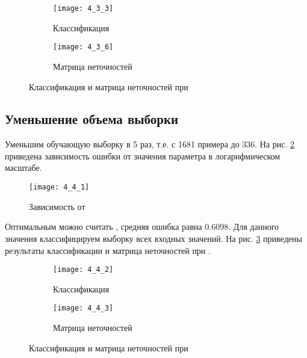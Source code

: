 \begin{figure}[H]
\begin{center}
	\begin{subfigure}{0.49\textwidth}
		\texttt{[image: 4\_3\_3]}
		\caption{Классификация}
	\end{subfigure}
	\begin{subfigure}{0.49\textwidth}
		\texttt{[image: 4\_3\_6]}
		\caption{Матрица неточностей}
	\end{subfigure}
	\caption{Классификация и матрица неточностей при }
	\label{fig:3_2_4}
\end{center}
\end{figure}

\subsection{Уменьшение объема выборки}


Уменьшим обучающую выборку в 5 раз, т.е. с 1681 примера до 336. На рис. \ref{fig:4_4_1} приведена зависимость ошибки  от значения параметра  в логарифмическом масштабе. 
\begin{figure}[H]
\begin{center}
	\texttt{[image: 4\_4\_1]}
	\caption{Зависимость  от }
	\label{fig:4_4_1}
\end{center}
\end{figure}

Оптимальным можно считать , средняя ошибка равна $0.6098$. Для данного значения классифицируем выборку всех входных значений. На рис. \ref{fig:4_4_2} приведены результаты классификации и матрица неточностей при .
\begin{figure}[H]
\begin{center}
	\begin{subfigure}{0.49\textwidth}
		\texttt{[image: 4\_4\_2]}
		\caption{Классификация}
	\end{subfigure}
	\begin{subfigure}{0.49\textwidth}
		\texttt{[image: 4\_4\_3]}
		\caption{Матрица неточностей}
	\end{subfigure}
	\caption{Классификация и матрица неточностей при }
	\label{fig:4_4_2}
\end{center}
\end{figure}

